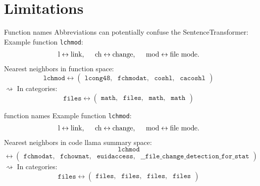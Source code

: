 \documentclass[aspectratio=1610,12pt]{beamer}
\begin{document}
\section{Limitations}
\begin{frame}{Function names}
  Abbreviations can potentially confuse the SentenceTransformer: \\
  Example function \texttt{lchmod}:
  \begin{align*}
    \text{l} \leftrightarrow \text{link}, \hspace{0.5cm}
    \text{ch} \leftrightarrow \text{change},\hspace{0.5cm}
    \text{mod} \leftrightarrow \text{file mode}.
  \end{align*}
  Nearest neighbors in function space: 
    \[  
      \texttt{lchmod} \leftrightarrow 
      \begin{pmatrix}
        \texttt{lcong48},& \texttt{fchmodat}, &
        \texttt{coshl}, & \texttt{cacoshl} 
      \end{pmatrix}
    \]
  $\rightsquigarrow$ In categories:
    \[  
      \texttt{files} \leftrightarrow 
      \begin{pmatrix}
        \texttt{math},& \texttt{files}, &
        \texttt{math}, & \texttt{math} 
      \end{pmatrix}
    \]
\end{frame}

\begin{frame}{function names}
  Example function \texttt{lchmod}:
  \begin{align*}
    \text{l} \leftrightarrow \text{link}, \hspace{0.5cm}
    \text{ch} \leftrightarrow \text{change},\hspace{0.5cm}
    \text{mod} \leftrightarrow \text{file mode}.
  \end{align*}
  Nearest neighbors in code llama summary space: 
  \[
    \texttt{lchmod}
  \]
    \[  
       \leftrightarrow 
      \begin{pmatrix}
        \texttt{fchmodat},& \texttt{fchownat}, &
        \texttt{euidaccess}, & \texttt{\_\_file\_change\_detection\_for\_stat} 
      \end{pmatrix}
    \]
  $\rightsquigarrow$ In categories:
    \[  
      \texttt{files} \leftrightarrow 
      \begin{pmatrix}
        \texttt{files},& \texttt{files}, &
        \texttt{files}, & \texttt{files} 
      \end{pmatrix}
    \]
\end{frame}
\end{document}
